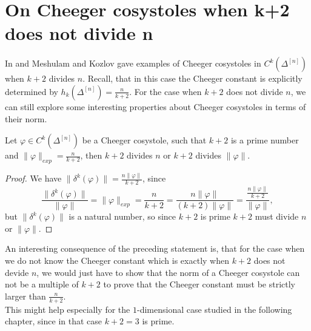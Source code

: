 %
%
%
%

\section{On Cheeger cosystoles when k+2 does not divide n}\label{section26}

In \cite{4} and \cite{6} Meshulam and Kozlov gave examples of Cheeger cosystoles in \(C^k(\Delta^{[n]})\) when \(k+2\) divides \(n\). Recall, that in this case the Cheeger constant is explicitly determined by \(h_k(\Delta^{[n]})=\frac{n}{k+2}\). For the case when \(k+2\) does not divide \(n\), we can still explore some interesting properties about Cheeger cosystoles in terms of their norm.

\begin{prop}\label{proposition261}
Let \(\varphi\in C^k(\Delta^{[n]})\) be a Cheeger cosystole, such that \(k+2\) is a prime number and \(\|\varphi\|_{exp}=\frac{n}{k+2}\), then \(k+2\) divides \(n\) or \(k+2\) divides \(\|\varphi\|\).
\begin{proof}
We have \(\|\delta^k(\varphi)\|=\frac{n\|\varphi\|}{k+2}\), since
\[
\frac{\|\delta^k(\varphi)\|}{\|\varphi\|}=\|\varphi\|_{exp}=\frac{n}{k+2}=\frac{n\|\varphi\|}{(k+2)\|\varphi\|}=\frac{\frac{n\|\varphi\|}{k+2}}{\|\varphi\|},
\]
but \(\|\delta^k(\varphi)\|\) is a natural number, so since \(k+2\) is prime \(k+2\) must divide \(n\) or \(\|\varphi\|\).
\end{proof}
\end{prop}

An interesting consequence of the preceding statement is, that for the case when we do not know the Cheeger constant which is exactly when \(k+2\) does not devide \(n\), we would just have to show that the norm of a Cheeger cosystole can not be a multiple of \(k+2\) to prove that the Cheeger constant must be strictly larger than \(\frac{n}{k+2}\).\\ 
This might help especially for the \(1\)-dimensional case studied in the following chapter, since in that case \(k+2=3\) is prime. 